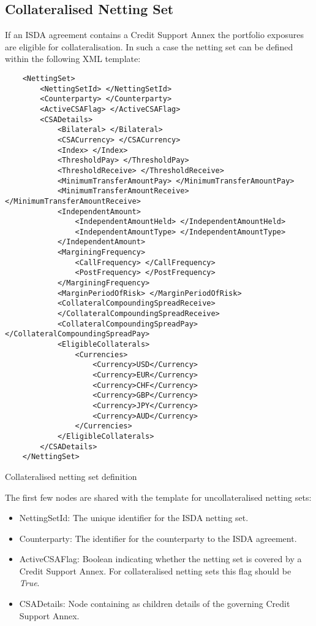 \subsection{Collateralised Netting Set}
If an ISDA agreement contains a Credit Support Annex the
portfolio exposures are eligible for collateralisation. In such a
case the netting set can be defined within the following XML template:

\begin{listing}[H]
\begin{verbatim}
    <NettingSet>
        <NettingSetId> </NettingSetId>
        <Counterparty> </Counterparty>
        <ActiveCSAFlag> </ActiveCSAFlag>
        <CSADetails>
            <Bilateral> </Bilateral>
            <CSACurrency> </CSACurrency>
            <Index> </Index>
            <ThresholdPay> </ThresholdPay>
            <ThresholdReceive> </ThresholdReceive>
            <MinimumTransferAmountPay> </MinimumTransferAmountPay>
            <MinimumTransferAmountReceive> </MinimumTransferAmountReceive>
            <IndependentAmount>
                <IndependentAmountHeld> </IndependentAmountHeld>
                <IndependentAmountType> </IndependentAmountType>
            </IndependentAmount>
            <MarginingFrequency>
                <CallFrequency> </CallFrequency>
                <PostFrequency> </PostFrequency>
            </MarginingFrequency>
            <MarginPeriodOfRisk> </MarginPeriodOfRisk>
            <CollateralCompoundingSpreadReceive> 
            </CollateralCompoundingSpreadReceive>
            <CollateralCompoundingSpreadPay> </CollateralCompoundingSpreadPay>
            <EligibleCollaterals>
                <Currencies>
                    <Currency>USD</Currency>
                    <Currency>EUR</Currency>
                    <Currency>CHF</Currency>
                    <Currency>GBP</Currency>
                    <Currency>JPY</Currency>
                    <Currency>AUD</Currency>
                </Currencies>
            </EligibleCollaterals>
        </CSADetails>
    </NettingSet>
\end{verbatim}
\caption{Collateralised netting set definition}
\label{lst:nettingSetCollat}
\end{listing}

The first few nodes are shared with the template for uncollateralised
netting sets:
\begin{itemize}
\item NettingSetId: The unique identifier for the ISDA netting set.
\item Counterparty: The identifier for the counterparty to the ISDA agreement.
\item ActiveCSAFlag: Boolean indicating whether the netting set is
  covered by a Credit Support Annex. For collateralised netting sets
  this flag should be \emph{True}.
\item CSADetails: Node containing as children details of the governing
  Credit Support Annex. 
\end{itemize}


